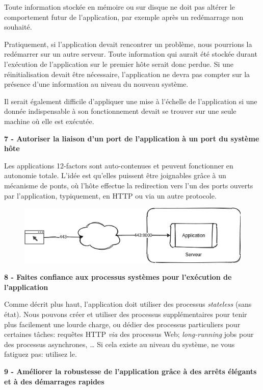 \documentclass[11pt]{amsbook}
\begin{document}
Toute information stockée en mémoire ou sur disque ne doit pas altérer le comportement futur de l’application, par exemple après un redémarrage non souhaité.


Pratiquement, si l’application devait rencontrer un problème, nous pourrions la redémarrer sur un autre serveur. Toute information qui aurait été stockée durant l’exécution de l’application sur le premier hôte serait donc perdue.
Si une réinitialisation devait être nécessaire, l’application ne devra pas compter sur la présence d’une information au niveau du nouveau système.


Il serait également difficile d’appliquer une mise à l’échelle de l’application si une donnée indispensable à son fonctionnement devait se trouver sur une seule machine où elle est exécutée.


\textbf{7 - Autoriser la liaison d’un port de l’application à un port du système hôte}


Les applications 12-factors sont auto-contenues et peuvent fonctionner en autonomie totale.
L’idée est qu’elles puissent être joignables grâce à un mécanisme de ponts, où l’hôte effectue la redirection vers l’un des ports ouverts par l’application, typiquement, en HTTP ou via un autre protocole.


\begin{figure}[h]{}
\centering\includegraphics[width=2.5truein]{images/diagrams/12-factors-7.png}

\centering
\end{figure}

\textbf{8 - Faites confiance aux processus systèmes pour l’exécution de l’application}


Comme décrit plus haut, l’application doit utiliser des processus \emph{stateless} (sans état).
Nous pouvons créer et utiliser des processus supplémentaires pour tenir plus facilement une lourde charge, ou dédier des processus particuliers pour certaines tâches: requêtes HTTP \emph{via} des processus Web; \emph{long-running} jobs pour des processus asynchrones, …​
Si cela existe au niveau du système, ne vous fatiguez pas: utilisez le.


\textbf{9 - Améliorer la robustesse de l’application grâce à des arrêts élégants et à des démarrages rapides}
\end{document}
